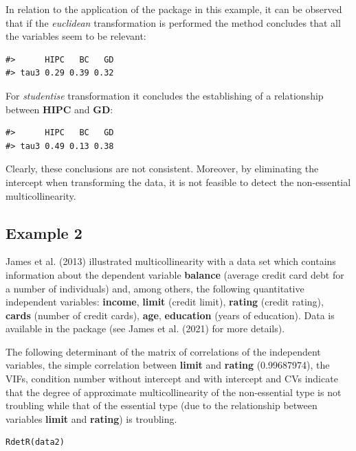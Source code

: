 In relation to the application of the  package in this example, it can be observed that if the \emph{euclidean} transformation is performed the method concludes that all the variables seem to be relevant:

\begin{verbatim}
#>      HIPC   BC   GD
#> tau3 0.29 0.39 0.32
\end{verbatim}

For \emph{studentise} transformation it concludes the establishing of a relationship between \textbf{HIPC} and \textbf{GD}:

\begin{verbatim}
#>      HIPC   BC   GD
#> tau3 0.49 0.13 0.38
\end{verbatim}

Clearly, these conclusions are not consistent. Moreover, by eliminating the intercept when transforming the data, it is not feasible to detect the non-essential multicollinearity.

\hypertarget{example-2}{%
\subsection{Example 2}\label{example-2}}

James et al. (2013) illustrated multicollinearity with a data set which contains information about the dependent variable \textbf{balance} (average credit card debt for a number of individuals) and, among others, the following quantitative independent variables: \textbf{income}, \textbf{limit} (credit limit), \textbf{rating} (credit rating), \textbf{cards} (number of credit cards), \textbf{age}, \textbf{education} (years of education). Data is available in the  package (see James et al. (2021) for more details).

The following determinant of the matrix of correlations of the independent variables, the simple correlation between \textbf{limit} and \textbf{rating} (0.99687974), the VIFs, condition number without intercept and with intercept and CVs indicate that the degree of approximate multicollinearity of the non-essential type is not troubling while that of the essential type (due to the relationship between variables \textbf{limit} and \textbf{rating}) is troubling.

\begin{verbatim}
RdetR(data2)
\end{verbatim}

